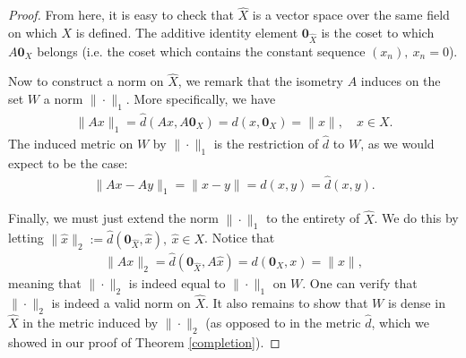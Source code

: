\documentclass[11pt]{article}
\theoremstyle{mystyle}
\newcommand{\0}{\mathbf{0}}
\begin{document}
\begin{proof}
From here, it is easy to check that $\hat{X}$ is a vector space over the same field on which $X$ is defined. The additive identity element $\0_{\hat{X}}$ is the coset to which $A\0_{X}$ belongs (i.e. the coset which contains the constant sequence $(x_n), \ x_n = 0$).

Now to construct a norm on $\hat{X}$, we remark that the isometry $A$ induces on the set $W$ a norm $\|\cdot\|_1$. More specifically, we have
\begin{align*}
\|Ax\|_1 = \hat{d}(Ax, A\0_{X}) = d(x, \0_{X}) = \|x\|, \quad x \in X.
\end{align*}
The induced metric on $W$ by $\|\cdot\|_1$ is the restriction of $\hat{d}$ to $W$, as we would expect to be the case:
\begin{align*}
    \|Ax - Ay\|_1 = \|x - y\| = d(x, y) = \hat{d}(x, y).
\end{align*}

Finally, we must just extend the norm $\|\cdot\|_1$ to the entirety of $\hat{X}$. We do this by letting $\|\hat{x}\|_2 := \hat{d}(\0_{\hat{X}}, \hat{x}), \ \hat{x} \in X$. Notice that
\begin{align*}
\|Ax\|_2 = \hat{d}(\0_{\hat{X}}, A\hat{x}) = d(\0_{X}, x) = \|x\|,
\end{align*}
meaning that $\|\cdot\|_2$ is indeed equal to $\|\cdot\|_1$ on $W$. One can verify that $\|\cdot\|_2$ is indeed a valid norm on $\hat{X}$. It also remains to show that $W$ is dense in $\hat{X}$ in the metric induced by $\|\cdot\|_2$ (as opposed to in the metric $\hat{d}$, which we showed in our proof of Theorem \ref{completion}).
\end{proof}
\end{document}
